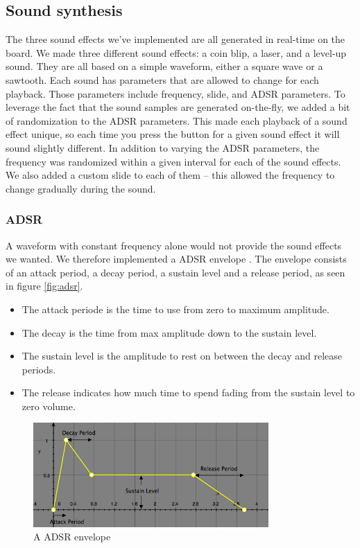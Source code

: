 \subsection{Sound synthesis}
The three sound effects we've implemented are all generated in real-time on the board.
We made three different sound effects: a coin blip, a laser, and a level-up sound.
They are all based on a simple waveform, either a square wave or a sawtooth.
Each sound has parameters that are allowed to change for each playback.
Those parameters include frequency, slide, and ADSR parameters.
To leverage the fact that the sound samples are generated on-the-fly, we added a bit of randomization to the ADSR parameters.
This made each playback of a sound effect unique, so each time you press the button for a given sound effect it will sound slightly different.
In addition to varying the ADSR parameters, the frequency was randomized within a given interval for each of the sound effects.
We also added a custom slide to each of them – this allowed the frequency to change gradually during the sound.

\subsubsection{ADSR}

A waveform with constant frequency alone would not provide the sound effects we wanted. We therefore implemented a ADSR envelope \cite{adsr}.
The envelope consists of an attack period, a decay period, a sustain level and a release period, as seen in figure \ref{fig:adsr}.

\begin{itemize}
    \item The attack periode is the time to use from zero to maximum amplitude.
    \item The decay is the time from max amplitude down to the sustain level.
    \item The sustain level is the amplitude to rest on between the decay and release periods.
    \item The release indicates how much time to spend fading from the sustain level to zero volume.
\end{itemize}

\begin{figure}[ht!]
    \begin{center}
    \includegraphics[width=0.8\textwidth]{assets/img/adsr.png}
    \caption{A ADSR envelope}
    \label{fig:adsr_envelope}
    \end{center}
\end{figure}

